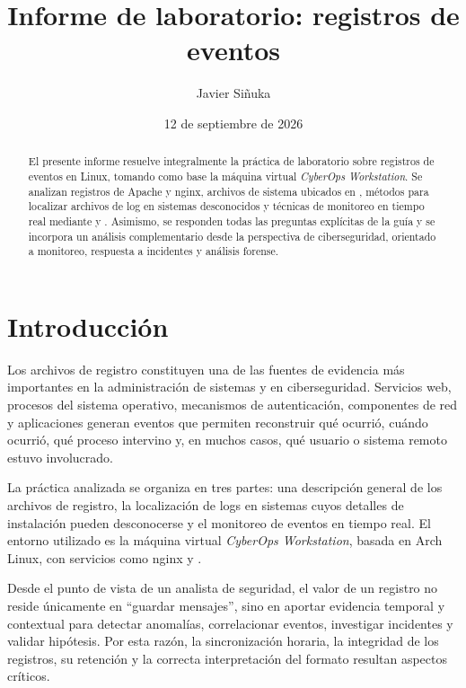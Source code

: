 \documentclass[11pt,a4paper]{article}
\title{Informe de laboratorio: registros de eventos}
\author{Javier Siñuka}
\date{12 de septiembre de 2026}
\newcommand{\cmd}[1]{\texttt{\detokenize{#1}}}
\newcommand{\ruta}[1]{\path{#1}}
\begin{document}
\maketitle
\thispagestyle{plain}

\clearpage
\tableofcontents
\newpage

\begin{abstract}
El presente informe resuelve integralmente la práctica de laboratorio sobre registros de eventos en Linux, tomando como base la máquina virtual \emph{CyberOps Workstation}. Se analizan registros de Apache y nginx, archivos de sistema ubicados en \ruta{/var/log}, métodos para localizar archivos de log en sistemas desconocidos y técnicas de monitoreo en tiempo real mediante \cmd{tail} y \cmd{journalctl}. Asimismo, se responden todas las preguntas explícitas de la guía y se incorpora un análisis complementario desde la perspectiva de ciberseguridad, orientado a monitoreo, respuesta a incidentes y análisis forense.
\end{abstract}

\section{Introducción}

Los archivos de registro constituyen una de las fuentes de evidencia más importantes en la administración de sistemas y en ciberseguridad. Servicios web, procesos del sistema operativo, mecanismos de autenticación, componentes de red y aplicaciones generan eventos que permiten reconstruir qué ocurrió, cuándo ocurrió, qué proceso intervino y, en muchos casos, qué usuario o sistema remoto estuvo involucrado.

La práctica analizada se organiza en tres partes: una descripción general de los archivos de registro, la localización de logs en sistemas cuyos detalles de instalación pueden desconocerse y el monitoreo de eventos en tiempo real. El entorno utilizado es la máquina virtual \emph{CyberOps Workstation}, basada en Arch Linux, con servicios como nginx y \cmd{systemd-journald}.

Desde el punto de vista de un analista de seguridad, el valor de un registro no reside únicamente en ``guardar mensajes'', sino en aportar evidencia temporal y contextual para detectar anomalías, correlacionar eventos, investigar incidentes y validar hipótesis. Por esta razón, la sincronización horaria, la integridad de los registros, su retención y la correcta interpretación del formato resultan aspectos críticos.
\end{document}

